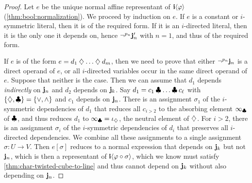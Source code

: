 \documentclass[a4paper]{memoir}
\begin{document}
\begin{proof}
	Let $e$ be the unique normal affine representant of $\mathbf{i} \langle \varphi \rangle$ (\cref{thm:bool:normalization}).
	We proceed by induction on $e$.
	If $e$ is a constant or $i$-symmetric literal, then it is of the required form.
	If it is an $i$-directed literal, then it is the only one it depends on, hence $\lnot^{p_n} \mathbf{j}_n'$ with $n=1$, and thus of the required form.
	
	If $e$ is of the form $e = d_1 \mathbin{\diamondsuit} \ldots \mathbin{\diamondsuit} d_m$, then we need to prove that either $\lnot^{p_n} \mathbf{j}_n$ is a direct operand of $e$, or all $i$-directed variables occur in the same direct operand of $e$.
	Suppose that neither is the case. Then we can assume that $d_1$ depends \emph{indirectly} on $\mathbf{j}_n$ and $d_2$ depends on $\mathbf{j}_k$.
	Say $d_1 = c_1 \mathbin{\clubsuit} \ldots \mathbin{\clubsuit} c_\ell$ with $\mathopen{}\left\{ {\mathbin{\diamondsuit}}, {\mathbin{\clubsuit}} \right\}\mathclose{} = \mathopen{}\left\{ {\vee}, {\wedge} \right\}\mathclose{}$ and $c_1$ depends on $\mathbf{j}_n$.
	There is an assignment $\sigma_1$ of the $i$-symmetric dependencies of $d_1$ that reduces all $c_{i > 2}$ to the absorbing element $\infty_{\mathbin{\clubsuit}}$ of $\mathbin{\clubsuit}$, and thus reduces $d_1$ to $\infty_{\mathbin{\clubsuit}} = \iota_{\mathbin{\diamondsuit}}$, the neutral element of $\mathbin{\diamondsuit}$.
	For $i > 2$, there is an assignment $\sigma_i$ of the $i$-symmetric dependencies of $d_i$ that preserves all $i$-directed dependencies.
	We combine all these assignments to a single assignment $\sigma : U \to V$. Then $e[\sigma]$ reduces to a normal expression that depends on $\mathbf{j}_k$ but not $\mathbf{j}_n$, which is then a representant of $\mathbf{i} \langle \varphi \circ \sigma \rangle$, which we know must satisfy \cref{thm:char-twisted-cube-to-line} and thus cannot depend on $\mathbf{j}_k$ without also depending on $\mathbf{j}_n$.
%	
%	
%	
%	
%	

\end{proof}
\end{document}
